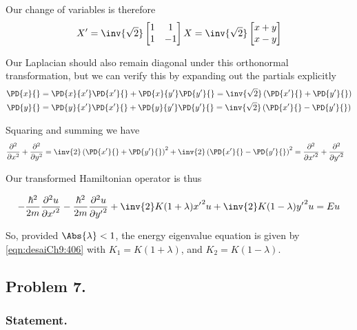 Our change of variables is therefore
\begin{align}\label{eqn:desaiCh9:503}
X' =
\inv{\sqrt{2}}
\begin{bmatrix}
1 & 1 \\
1 & -1
\end{bmatrix}
X
=
\inv{\sqrt{2}}
\begin{bmatrix}
x + y \\
x - y
\end{bmatrix}
\end{align}

Our Laplacian should also remain diagonal under this orthonormal transformation, but we can verify this by expanding out the partials explicitly
\begin{align}\label{eqn:desaiCh9:504}
\PD{x}{} &=
\PD{x}{x'}\PD{x'}{}
+\PD{x}{y'}\PD{y'}{} = \inv{\sqrt{2}} \left( \PD{x'}{} + \PD{y'}{} \right) \\
\PD{y}{} &=
\PD{y}{x'}\PD{x'}{} +\PD{y}{y'}\PD{y'}{}
= \inv{\sqrt{2}}
\left( \PD{x'}{} - \PD{y'}{} \right)
\end{align}

Squaring and summing we have
\begin{align}\label{eqn:desaiCh9:505}
\frac{\partial^2}{\partial x^2} +
\frac{\partial^2}{\partial y^2}
&=
\inv{2} \left( \PD{x'}{} + \PD{y'}{} \right)^2
+\inv{2} \left( \PD{x'}{} - \PD{y'}{} \right)^2
=
\frac{\partial^2}{\partial {x'}^2} +
\frac{\partial^2}{\partial {y'}^2}
\end{align}

Our transformed Hamiltonian operator is thus

\begin{align}\label{eqn:desaiCh9:506}
-\frac{\hbar^2}{2m} \frac{\partial^2 u}{\partial {x'}^2}
-\frac{\hbar^2}{2m} \frac{\partial^2 u}{\partial {y'}^2}
+ \inv{2} K(1+\lambda) {x'}^2 u
+ \inv{2} K(1-\lambda) {y'}^2 u
= E u
\end{align}

So, provided $\Abs{\lambda} < 1$, the energy eigenvalue equation is given by \ref{eqn:desaiCh9:406} with $K_1 = K(1+ \lambda)$, and $K_2 = K(1 -\lambda)$.

\subsection{Problem 7.}
\subsubsection{Statement.}

